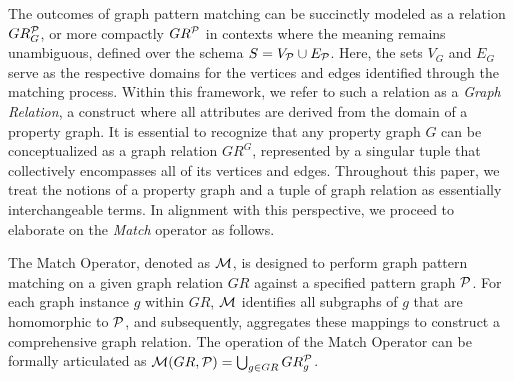 The outcomes of graph pattern matching can be succinctly modeled as a relation \(GR_G^{\mathcal{P}}\), or more compactly \(GR^{\mathcal{P}}\) in contexts where the meaning remains unambiguous, defined over the schema \(S = V_{\mathcal{P}} \cup E_{\mathcal{P}}\). Here, the sets \(V_G\) and \(E_G\) serve as the respective domains for the vertices and edges identified through the matching process. Within this framework, we refer to such a relation as a \emph{Graph Relation}, a construct where all attributes are derived from the domain of a property graph.
It is essential to recognize that any property graph \(G\) can be conceptualized as a graph relation \(GR^G\), represented by a singular tuple that collectively encompasses all of its vertices and edges. Throughout this paper, we treat the notions of a property graph and a tuple of graph relation as essentially interchangeable terms. In alignment with this perspective, we proceed to elaborate on the \emph{Match} operator as follows.



\begin{definition}
    \label{def:match}
    The Match Operator, denoted as \(\mathcal{M}\), is designed to perform graph pattern matching on a given graph relation \(GR\) against a specified pattern graph \(\mathcal{P}\). For each graph instance \(g\) within \(GR\), \(\mathcal{M}\) identifies all subgraphs of \(g\) that are homomorphic to \(\mathcal{P}\), and subsequently, aggregates these mappings to construct a comprehensive graph relation. The operation of the Match Operator can be formally articulated as \(\mathcal{M}(GR, \mathcal{P}) = \bigcup_{g \in GR} GR_g^{\mathcal{P}}\).%
\end{definition}

